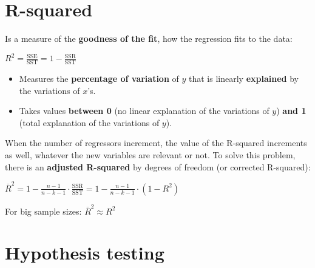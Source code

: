 \documentclass[10pt, a4paper, landscape]{extarticle}
\newcommand{\SSR}{\mathrm{SSR}}
\newcommand{\SSE}{\mathrm{SSE}}
\newcommand{\SST}{\mathrm{SST}}
\begin{document}
\begin{multicols}{3}
\section*{R-squared}
	Is a measure of the \textbf{goodness of the fit}, how the regression fits to the data:
	\begin{center}
		$R^2 = \frac{\SSE}{\SST} = 1 - \frac{\SSR}{\SST}$
	\end{center}
	\begin{itemize}[leftmargin=*]
		\item Measures the \textbf{percentage of variation} of $y$ that is linearly \textbf{explained} by the variations of $x$'s.
		\item Takes values \textbf{between 0} (no linear explanation of the variations of $y$) \textbf{and 1} (total explanation of the variations of $y$).
	\end{itemize}
	When the number of regressors increment, the value of the R-squared increments as well, whatever the new variables are relevant or not. To solve this problem, there is an \textbf{adjusted R-squared} by degrees of freedom (or corrected R-squared):
	\begin{center}
		$\overline{R}^2 = 1 - \frac{n-1}{n-k-1} \cdot \frac{\SSR}{\SST} = 1 - \frac{n-1}{n-k-1} \cdot (1-R^2)$
	\end{center}
	For big sample sizes: $\overline{R}^2 \approx R^2$

\section*{Hypothesis testing}

\end{multicols}
\end{document}
